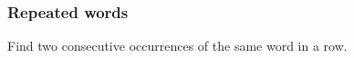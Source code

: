 \begin{frame}[fragile]
  \frametitle{Repeated words}
  Find two consecutive occurrences of the same word in a row.
\end{frame}
